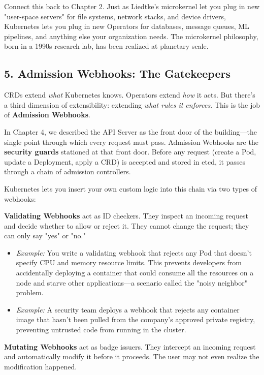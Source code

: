 Connect this back to Chapter 2. Just as Liedtke's microkernel let you plug in new "user-space servers" for file systems, network stacks, and device drivers, Kubernetes lets you plug in new Operators for databases, message queues, ML pipelines, and anything else your organization needs. The microkernel philosophy, born in a 1990s research lab, has been realized at planetary scale.


\subsection{5. Admission Webhooks: The Gatekeepers}


CRDs extend \textit{what} Kubernetes knows. Operators extend \textit{how} it acts. But there's a third dimension of extensibility: extending \textit{what rules it enforces}. This is the job of \textbf{Admission Webhooks}.

In Chapter 4, we described the API Server as the front door of the building---the single point through which every request must pass. Admission Webhooks are the \textbf{security guards} stationed at that front door. Before any request (create a Pod, update a Deployment, apply a CRD) is accepted and stored in etcd, it passes through a chain of admission controllers.

Kubernetes lets you insert your own custom logic into this chain via two types of webhooks:

\textbf{Validating Webhooks} act as ID checkers. They inspect an incoming request and decide whether to allow or reject it. They cannot change the request; they can only say "yes" or "no."

\begin{itemize}
\item \textit{Example:} You write a validating webhook that rejects any Pod that doesn't specify CPU and memory resource limits. This prevents developers from accidentally deploying a container that could consume all the resources on a node and starve other applications---a scenario called the "noisy neighbor" problem.
\item \textit{Example:} A security team deploys a webhook that rejects any container image that hasn't been pulled from the company's approved private registry, preventing untrusted code from running in the cluster.
\end{itemize}

\textbf{Mutating Webhooks} act as badge issuers. They intercept an incoming request and automatically modify it before it proceeds. The user may not even realize the modification happened.

